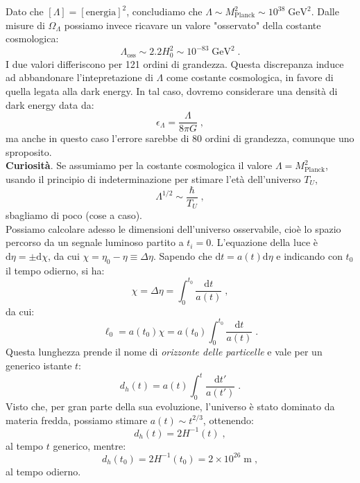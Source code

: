\documentclass[12pt,a4paper]{report}
\theoremstyle{definition}
\newcommand{\diff}[1][]{\mathrm{d}#1}
\begin{document}
Dato che $[\Lambda]=[\mbox{energia}]^2$, concludiamo che $\Lambda\sim M_{\mathrm{Planck}}^2\sim 10^{38}\;\mathrm{GeV}^2$. Dalle misure di $\Omega_{\Lambda}$ possiamo invece ricavare un valore "osservato" della costante cosmologica:
\begin{equation}
\Lambda_{\mathrm{oss}}\sim 2.2 H_0^2\sim 10^{-83}\;\mathrm{GeV}^2\;.
\end{equation}
I due valori differiscono per 121 ordini di grandezza. Questa discrepanza induce ad abbandonare l'intepretazione di $\Lambda$ come costante cosmologica, in favore di quella legata alla dark energy. In tal caso, dovremo considerare una densità di dark energy data da:
\begin{equation}
\epsilon_{\Lambda}=\frac{\Lambda}{8\pi G}\;,
\end{equation}
ma anche in questo caso l'errore sarebbe di 80 ordini di grandezza, comunque uno sproposito. \\
\textbf{Curiosità}. Se assumiamo per la costante cosmologica il valore $\Lambda=M_{\mathrm{Planck}}^2$, usando il principio di indeterminazione per stimare l'età dell'universo $T_U$,
$$
\Lambda^{1/2}\sim \frac{\hbar}{T_U}\;,
$$
sbagliamo di poco (cose a caso).
\\
Possiamo calcolare adesso le dimensioni dell'universo osservabile, cioè lo spazio percorso da un segnale luminoso partito a $t_i=0$. L'equazione della luce è $\diff{\eta}=\pm \diff{\chi}$, da cui $\chi=\eta_0-\eta\equiv\Delta\eta$. Sapendo che $\diff{t}=a(t)\diff{\eta}$ e indicando con $t_0$ il tempo odierno, si ha:
$$
\chi=\Delta\eta=\int_0^{t_0}\frac{\diff{t}}{a(t)}\;,
$$
da cui:
\begin{equation}
\ell_0=a(t_0)\chi=a(t_0)\int_0^{t_0}\frac{\diff{t}}{a(t)}\;.
\end{equation}
Questa lunghezza prende il nome di \emph{orizzonte delle particelle} e vale per un generico istante $t$:
\begin{equation}
d_h(t)=a(t)\int_0^t\frac{\diff{t'}}{a(t')}\;.
\end{equation}
Visto che, per gran parte della sua evoluzione, l'universo è stato dominato da materia fredda, possiamo stimare $a(t)\sim t^{2/3}$, ottenendo:
\begin{equation}
d_h(t)=2H^{-1}(t)\;,
\end{equation}
al tempo $t$ generico, mentre:
\begin{equation}
d_h(t_0)=2H^{-1}(t_0)=2\times 10^{26}\;\mathrm{m}\;,
\end{equation}
al tempo odierno. \\
\end{document}
